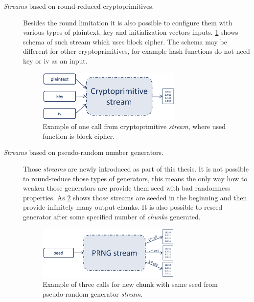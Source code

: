 \documentclass[
    digital,    %
    oneside,    %
    color,
    11pt,
    nocover,
    notable,
    nolof,
    nolot,
    final
]{fithesis3}
\begin{document}
\begin{description}
	\item[\textit{Streams} based on round-reduced cryptoprimitives.] Besides the round limitation it is also possible to configure them with various types of plaintext, key and initialization vectors inputs. \cref{fig:crypto-stream} shows schema of such stream which uses block cipher. The schema may be different for other cryptoprimitives, for example hash functions do not need key or iv as an input.
	
	\begin{figure}[h]
		\centering
		\includegraphics[width=0.7\textwidth]{./images/pictures/cryptoprimitive-stream.png}
		\caption{Example of one call from cryptoprimitive \textit{stream}, where used function is block cipher.}
		\label{fig:crypto-stream}
	\end{figure}
	
	\item[\textit{Streams} based on pseudo-random number generators.] Those \textit{streams} are newly introduced as part of this thesis. It is not possible to round-reduce those types of generators, this means the only way how to weaken those generators are provide them seed with bad randomness properties. As \cref{fig:prng-streams} shows those streams are seeded in the beginning and then provide infinitely many output chunks. It is also possible to reseed generator after some specified number of \textit{chunks} generated.
	
	\begin{figure}[h]
		\centering
		\includegraphics[width=0.7\textwidth]{./images/pictures/prng-stream.png}
		\caption{Example of three calls for new chunk with same seed from pseudo-random generator \textit{stream}.}
		\label{fig:prng-streams}
	\end{figure}
	
\end{description}
\end{document}
